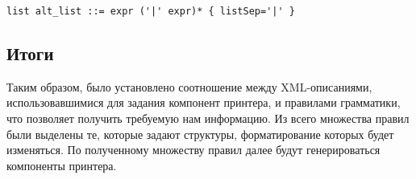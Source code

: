 {
\begin{lstlisting}
list alt_list ::= expr ('|' expr)* { listSep='|' }
\end{lstlisting}
}
\subsection{Итоги}
Таким образом, было установлено соотношение между XML-описаниями, использовавшимися для задания компонент принтера, и правилами грамматики, что позволяет получить требуемую нам информацию.
Из всего множества правил были выделены те, которые задают структуры, форматирование которых будет изменяться.
По полученному множеству правил далее будут генерироваться компоненты принтера.